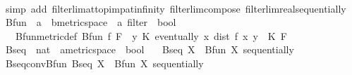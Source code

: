 \begin{isabellebody}
%
\isadelimproof
\ \ %
\endisadelimproof
%
\isatagproof
{}\isamarkupfalse%
\ {\isacharparenleft}{\kern0pt}simp\ add{\isacharcolon}{\kern0pt}\ filterlim{\isacharunderscore}{\kern0pt}at{\isacharunderscore}{\kern0pt}top{\isacharunderscore}{\kern0pt}imp{\isacharunderscore}{\kern0pt}at{\isacharunderscore}{\kern0pt}infinity\ filterlim{\isacharunderscore}{\kern0pt}compose\ filterlim{\isacharunderscore}{\kern0pt}real{\isacharunderscore}{\kern0pt}sequentially{\isacharparenright}{\kern0pt}%
\endisatagproof
{\isafoldproof}%
%
\isadelimproof
%
\endisadelimproof
%
\isadelimdocument
%
\endisadelimdocument
%
\isatagdocument
%
\isamarkuptrue%
%
\endisatagdocument
{\isafolddocument}%
%
\isadelimdocument
%
\endisadelimdocument
{}\isamarkupfalse%
\ Bfun\ {\isacharcolon}{\kern0pt}{\isacharcolon}{\kern0pt}\ {\isachardoublequoteopen}{\isacharparenleft}{\kern0pt}{\isacharprime}{\kern0pt}a\ {\isasymRightarrow}\ {\isacharprime}{\kern0pt}b{\isacharcolon}{\kern0pt}{\isacharcolon}{\kern0pt}metric{\isacharunderscore}{\kern0pt}space{\isacharparenright}{\kern0pt}\ {\isasymRightarrow}\ {\isacharprime}{\kern0pt}a\ filter\ {\isasymRightarrow}\ bool{\isachardoublequoteclose}\isanewline
\ \ \ Bfun{\isacharunderscore}{\kern0pt}metric{\isacharunderscore}{\kern0pt}def{\isacharcolon}{\kern0pt}\ {\isachardoublequoteopen}Bfun\ f\ F\ {\isacharequal}{\kern0pt}\ {\isacharparenleft}{\kern0pt}{\isasymexists}y{\isachardot}{\kern0pt}\ {\isasymexists}K{\isachargreater}{\kern0pt}{}{\isachardot}{\kern0pt}\ eventually\ {\isacharparenleft}{\kern0pt}{\isasymlambda}x{\isachardot}{\kern0pt}\ dist\ {\isacharparenleft}{\kern0pt}f\ x{\isacharparenright}{\kern0pt}\ y\ {\isasymle}\ K{\isacharparenright}{\kern0pt}\ F{\isacharparenright}{\kern0pt}{\isachardoublequoteclose}\isanewline
\isanewline
{}\isamarkupfalse%
\ Bseq\ {\isacharcolon}{\kern0pt}{\isacharcolon}{\kern0pt}\ {\isachardoublequoteopen}{\isacharparenleft}{\kern0pt}nat\ {\isasymRightarrow}\ {\isacharprime}{\kern0pt}a{\isacharcolon}{\kern0pt}{\isacharcolon}{\kern0pt}metric{\isacharunderscore}{\kern0pt}space{\isacharparenright}{\kern0pt}\ {\isasymRightarrow}\ bool{\isachardoublequoteclose}\isanewline
\ \ \ {\isachardoublequoteopen}Bseq\ X\ {\isasymequiv}\ Bfun\ X\ sequentially{\isachardoublequoteclose}\isanewline
\isanewline
{}\isamarkupfalse%
\ Bseq{\isacharunderscore}{\kern0pt}conv{\isacharunderscore}{\kern0pt}Bfun{\isacharcolon}{\kern0pt}\ {\isachardoublequoteopen}Bseq\ X\ {\isasymlongleftrightarrow}\ Bfun\ X\ sequentially{\isachardoublequoteclose}%

\end{isabellebody}
